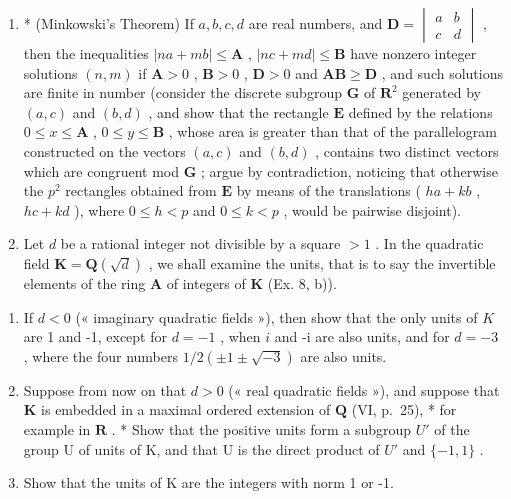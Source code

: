 \begin{enumerate}
\def\labelenumi{\arabic{enumi})}
\setcounter{enumi}{8}
\item
  * (Minkowski's Theorem) If \(a, b, c, d\) are real numbers, and \(\mathbf{D} = \begin{vmatrix} a & b \\ c & d \end{vmatrix}\) , then the inequalities \(|na + mb| \leqslant \mathbf{A}\) , \(|nc + md| \leqslant \mathbf{B}\) have nonzero integer solutions \((n, m)\) if \(\mathbf{A} > 0\) , \(\mathbf{B} > 0\) , \(\mathbf{D} > 0\) and \(\mathbf{AB} \geqslant \mathbf{D}\) , and such solutions are finite in number (consider the discrete subgroup \(\mathbf{G}\) of \(\mathbf{R}^2\) generated by \((a, c)\) and \((b, d)\) , and show that the rectangle \(\mathbf{E}\) defined by the relations \(0 \leqslant x \leqslant \mathbf{A}\) , \(0 \leqslant y \leqslant \mathbf{B}\) , whose area is greater than that of the parallelogram constructed on the vectors \((a, c)\) and \((b, d)\) , contains two distinct vectors which are congruent mod \(\mathbf{G}\) ; argue by contradiction, noticing that otherwise the \(p^2\) rectangles obtained from \(\mathbf{E}\) by means of the translations ( \(ha + kb\) , \(hc + kd\) ), where \(0 \leqslant h < p\) and \(0 \leqslant k < p\) , would be pairwise disjoint).
\item
  Let \(d\) be a rational integer not divisible by a square \(>1\) . In the quadratic field \(\mathbf{K} = \mathbf{Q}(\sqrt{d})\) , we shall examine the units, that is to say the invertible elements of the ring \(\mathbf{A}\) of integers of \(\mathbf{K}\) (Ex. 8, b)).
\end{enumerate}

\begin{enumerate}
\def\labelenumi{\alph{enumi})}
\item
  If \(d < 0\) (« imaginary quadratic fields »), then show that the only units of \(K\) are 1 and -1, except for \(d = -1\) , when \(i\) and -i are also units, and for \(d = -3\) , where the four numbers \(1/2(\pm 1 \pm \sqrt{-3})\) are also units.
\item
  Suppose from now on that \(d > 0\) (« real quadratic fields »), and suppose that \(\mathbf{K}\) is embedded in a maximal ordered extension of \(\mathbf{Q}\) (VI, p.~25), * for example in \(\mathbf{R}\) . * Show that the positive units form a subgroup \(U'\) of the group U of units of K, and that U is the direct product of \(U'\) and \(\{-1,1\}\) .
\item
  Show that the units of K are the integers with norm 1 or -1.
\end{enumerate}

